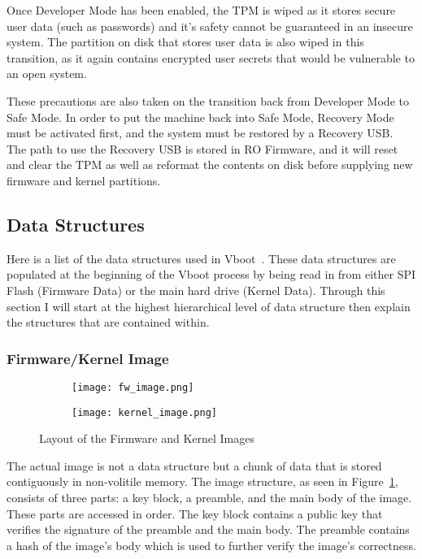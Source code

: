 \documentclass[../report.tex]{subfiles}
\begin{document}
Once Developer Mode has been enabled, the TPM is wiped as it stores secure user data (such as passwords) and it's safety cannot be guaranteed in an insecure system.
The partition on disk that stores user data is also wiped in this transition, as it again contains encrypted user secrets that would be vulnerable to an open system.

These precautions are also taken on the transition back from Developer Mode to Safe Mode. 
In order to put the machine back into Safe Mode, Recovery Mode must be activated first, and the system must be restored by a Recovery USB\@.
The path to use the Recovery USB is stored in RO Firmware, and it will reset and clear the TPM as well as reformat the contents on disk before supplying new firmware and kernel partitions. 

\subsection{Data Structures}

Here is a list of the data structures used in Vboot~\cite{vboot-data-structures}.
These data structures are populated at the beginning of the Vboot process by being read in from either SPI Flash (Firmware Data) or the main hard drive (Kernel Data).
Through this section I will start at the highest hierarchical level of data structure then explain the structures that are contained within.

\subsubsection{Firmware/Kernel Image}

\begin{figure}
\begin{subfigure}{.5\textwidth}
  \centering
  \texttt{[image: fw\_image.png]}
\end{subfigure}%
\begin{subfigure}{.5\textwidth}
  \centering
  \texttt{[image: kernel\_image.png]}
\end{subfigure}
\caption{Layout of the Firmware and Kernel Images}
\label{fig:vboot_images}
\end{figure}

The actual image is not a data structure but a chunk of data that is stored contiguously in non-volitile memory.
The image structure, as seen in Figure~\ref{fig:vboot_images}, consists of three parts: a key block, a preamble, and the main body of the image.
These parts are accessed in order.
The key block contains a public key that verifies the signature of the preamble and the main body. 
The preamble contains a hash of the image's body which is used to further verify the image's correctness.
\end{document}
